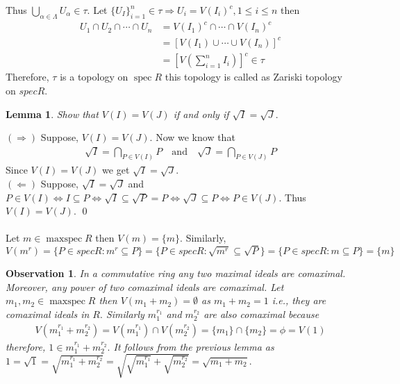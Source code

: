 \documentclass[11pt]{amsart}
\newtheorem{obs}[theorem]{Observation}
\newtheorem{lemma}[theorem]{Lemma}%
\DeclareMathOperator{\spec}{\text{spec}}
\DeclareMathOperator{\mspec}{\text{maxspec}}
\begin{document}
Thus $\displaystyle\bigcup_{\alpha\in \Lambda}U_{\alpha}\in \tau$. Let $\{U_I\}_{i=1}^n \in\tau \Rightarrow U_i=V(I_i)^c,1\leq i\leq n$ then \begin{align*}
U_1\cap U_2\cap\cdots\cap U_n&= V(I_1)^c\cap\cdots\cap V(I_n)^c\\
&=[V(I_1)\cup\cdots\cup V(I_n)]^c\\
&=\left[V\left(\displaystyle\sum_{i=1}^n I_i\right)\right]^c\in \tau
\end{align*}
Therefore, $\tau$ is a topology on $\spec R$ this topology is called as Zariski topology on $spec R.$

\begin{lemma}
Show that $V(I)=V(J)$ if and only if $\sqrt{I}=\sqrt{J}.$ 
\end{lemma}
\proof $(\Rightarrow)$ Suppose, $V(I)=V(J)$. Now we know that \begin{align*}
\sqrt{I}=\displaystyle\bigcap_{P\in V(I)} P\quad\text{and}\quad \sqrt{J}=\displaystyle\bigcap_{P\in V(J)} P
\end{align*}
Since $V(I)=V(J)$ we get $\sqrt{I}=\sqrt{J}.$\\
$(\Leftarrow)$ Suppose, $\sqrt{I}=\sqrt{J}$ and $P\in V(I) 
\Leftrightarrow I\subseteq P \Leftrightarrow \sqrt{I}\subseteq \sqrt{P}=P \Leftrightarrow \sqrt{J}\subseteq P \Leftrightarrow P\in V(J).$
Thus $V(I)=V(J).$ \qed\\\\
Let $m\in \mspec R$ then $V(m)=\{m\}.$ Similarly, $$V(m^r)=\{P\in spec R:m^r\subseteq P\} =\{P\in spec R:\sqrt{m^r}\subseteq \sqrt{P}\}=\{P\in spec R:m\subseteq P\}=\{m\}$$

\begin{obs}
In a commutative ring any two maximal ideals are comaximal. Moreover, any power of two comaximal ideals are comaximal. Let $m_1,m_2\in \mspec R$ then $V(m_1+m_2)=\emptyset$ as $m_1+m_2=1$ i.e., they are comaximal ideals in $R.$ Similarly $m_1^{r_1}$ and $m_2^{r_2}$ are also comaximal because \begin{align*}
V(m_1^{r_1}+m_2^{r_2})=V(m_1^{r_1})\cap V(m_2^{r_2})=\{m_1\}\cap \{m_2\}=\phi=V(1)
\end{align*}
therefore, $1\in m_1^{r_1}+m_2^{r_2}.$ It follows from the previous lemma as $1=\sqrt{1}=\sqrt{m_1^{r_1}+m_2^{r_2}}=\sqrt{\sqrt{m_1^{r_1}}+\sqrt{m_2^{r_2}}}=\sqrt{m_1+m_2}.$
\end{obs}
\end{document}
